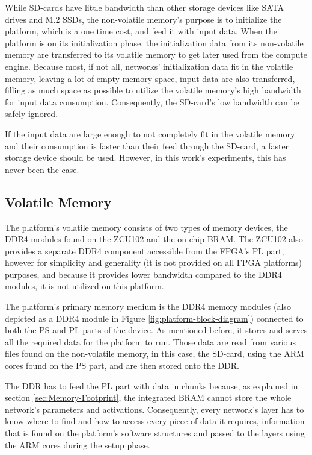While SD-cards have little bandwidth than other storage devices like SATA drives and M.2 SSDs, the non-volatile memory's purpose is to initialize the platform, which is a one time cost, and feed it with input data. When the platform is on its initialization phase, the initialization data from its non-volatile memory are transferred to its volatile memory to get later used from the compute engine. Because most, if not all, networks' initialization data fit in the volatile memory, leaving a lot of empty memory space, input data are also transferred, filling as much space as possible to utilize the volatile memory's high bandwidth for input data consumption. Consequently, the SD-card's low bandwidth can be safely ignored.

If the input data are large enough to not completely fit in the volatile memory and their consumption is faster than their feed through the SD-card, a faster storage device should be used. However, in this work's experiments, this has never been the case.

\subsection{Volatile Memory}
The platform's volatile memory consists of two types of memory devices, the DDR4 modules found on the ZCU102 and the on-chip BRAM. The ZCU102 also provides a separate DDR4 component accessible from the FPGA's PL part, however for simplicity and generality (it is not provided on all FPGA platforms) purposes, and because it provides lower bandwidth compared to the DDR4 modules, it is not utilized on this platform.

The platform's primary memory medium is the DDR4 memory modules  (also depicted as a DDR4 module in Figure \ref{fig:platform-block-diagram}) connected to both the PS and PL parts of the device. As mentioned before, it stores and serves all the required data for the platform to run. Those data are read from various files found on the non-volatile memory, in this case, the SD-card, using the ARM cores found on the PS part, and are then stored onto the DDR.

The DDR has to feed the PL part with data in chunks because, as explained in section \ref{sec:Memory-Footprint}, the integrated BRAM cannot store the whole network's parameters and activations. Consequently, every network's layer has to know where to find and how to access every piece of data it requires, information that is found on the platform's software structures and passed to the layers using the ARM cores during the setup phase.

